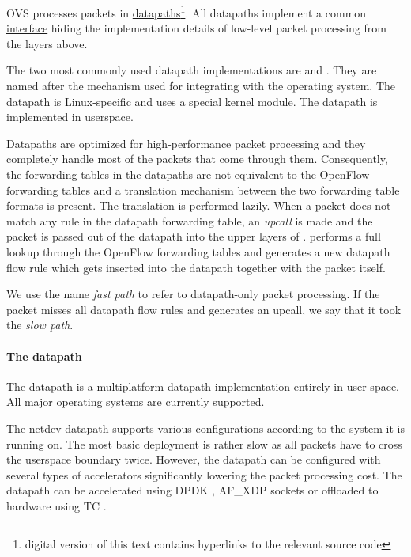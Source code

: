 OVS processes packets in \href{https://github.com/openvswitch/ovs/blob/e90a0727f17f6ad915a32735a8c0b282f2c8cd6f/lib/dpif.h}{datapaths}\footnote{digital version of this text contains hyperlinks to the relevant source code}. All datapaths implement a common \href{https://github.com/openvswitch/ovs/blob/e90a0727f17f6ad915a32735a8c0b282f2c8cd6f/lib/dpif-provider.h\#L107-L117}{interface} hiding the implementation details of low-level packet processing from the layers above.

The two most commonly used datapath implementations are \href{https://github.com/openvswitch/ovs/blob/e90a0727f17f6ad915a32735a8c0b282f2c8cd6f/lib/dpif-netdev.c}{} and \href{https://github.com/openvswitch/ovs/blob/e90a0727f17f6ad915a32735a8c0b282f2c8cd6f/lib/dpif-netlink.c}{}. They are named after the mechanism used for integrating with the operating system. The  datapath is Linux-specific and uses a special kernel module. The  datapath is implemented in userspace.

Datapaths are optimized for high-performance packet processing and they completely handle most of the packets that come through them. Consequently, the forwarding tables in the datapaths are not equivalent to the OpenFlow forwarding tables and a translation mechanism between the two forwarding table formats is present. The translation is performed lazily. When a packet does not match any rule in the datapath forwarding table, an \emph{upcall} is made and the packet is passed out of the datapath into the upper layers of .  performs a full lookup through the OpenFlow forwarding tables and generates a new datapath flow rule which gets inserted into the datapath together with the packet itself.

We use the name \emph{fast path} to refer to datapath-only packet processing. If the packet misses all datapath flow rules and generates an upcall, we say that it took the \emph{slow path}.

\paragraph{The  datapath}
The  datapath is a multiplatform datapath implementation entirely in user space. All major operating systems are currently supported.

The netdev datapath supports various configurations according to the system it is running on. The most basic deployment is rather slow as all packets have to cross the userspace boundary twice. However, the datapath can be configured with several types of accelerators significantly lowering the packet processing cost. The datapath can be accelerated using DPDK \cite{DPDK}, AF\_XDP sockets \cite{XDP} or offloaded to hardware using TC \cite{TCOffload}.

